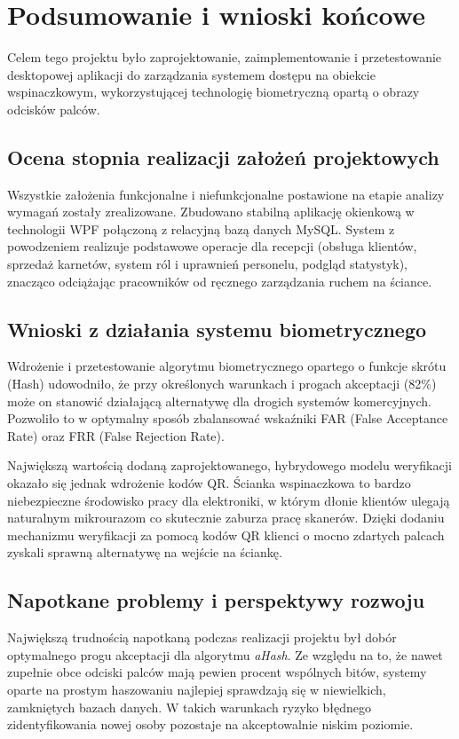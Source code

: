 \chapter{Podsumowanie i wnioski końcowe}
\label{ch:podsumowanie}

Celem tego projektu było zaprojektowanie, zaimplementowanie i przetestowanie desktopowej aplikacji do zarządzania systemem dostępu na obiekcie wspinaczkowym, wykorzystującej technologię biometryczną opartą o obrazy odcisków palców.

\section{Ocena stopnia realizacji założeń projektowych}
Wszystkie założenia funkcjonalne i niefunkcjonalne postawione na etapie analizy wymagań zostały zrealizowane. Zbudowano stabilną aplikację okienkową w technologii WPF połączoną z relacyjną bazą danych MySQL. System z powodzeniem realizuje podstawowe operacje dla recepcji (obsługa klientów, sprzedaż karnetów, system ról i uprawnień personelu, podgląd statystyk), znacząco odciążając pracowników od ręcznego zarządzania ruchem na ściance.

\section{Wnioski z działania systemu biometrycznego}
Wdrożenie i przetestowanie algorytmu biometrycznego opartego o funkcje skrótu (Hash) udowodniło, że przy określonych warunkach i progach akceptacji (82\%) może on stanowić działającą alternatywę dla drogich systemów komercyjnych. Pozwoliło to w optymalny sposób zbalansować wskaźniki FAR (False Acceptance Rate) oraz FRR (False Rejection Rate).

Największą wartością dodaną zaprojektowanego, hybrydowego modelu weryfikacji okazało się jednak wdrożenie kodów QR. Ścianka wspinaczkowa to bardzo niebezpieczne środowisko pracy dla elektroniki, w którym dłonie klientów ulegają naturalnym mikrourazom co skutecznie zaburza pracę skanerów. Dzięki dodaniu mechanizmu weryfikacji za pomocą kodów QR klienci o mocno zdartych palcach zyskali sprawną alternatywę na wejście na ściankę.

\section{Napotkane problemy i perspektywy rozwoju}
Największą trudnością napotkaną podczas realizacji projektu był dobór optymalnego progu akceptacji dla algorytmu \textit{aHash}. Ze względu na to, że nawet zupełnie obce odciski palców mają pewien procent wspólnych bitów, systemy oparte na prostym haszowaniu najlepiej sprawdzają się w niewielkich, zamkniętych bazach danych. W takich warunkach ryzyko błędnego zidentyfikowania nowej osoby pozostaje na akceptowalnie niskim poziomie.

